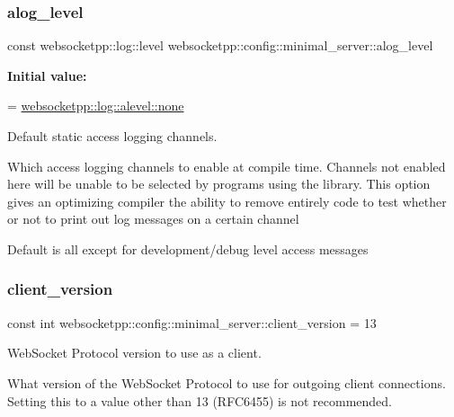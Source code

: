 \subsubsection{\texorpdfstring{alog\+\_\+level}{alog\_level}}
{\footnotesize\ttfamily const websocketpp\+::log\+::level websocketpp\+::config\+::minimal\+\_\+server\+::alog\+\_\+level\hspace{0.3cm}{\ttfamily [static]}}

{\bfseries Initial value\+:}
\begin{DoxyCode}
=
        \mbox{\hyperlink{structwebsocketpp_1_1log_1_1alevel_a4cf0520816094999975fe73081cf30f2}{websocketpp::log::alevel::none}}
\end{DoxyCode}


Default static access logging channels. 

Which access logging channels to enable at compile time. Channels not enabled here will be unable to be selected by programs using the library. This option gives an optimizing compiler the ability to remove entirely code to test whether or not to print out log messages on a certain channel

Default is all except for development/debug level access messages \mbox{\label{structwebsocketpp_1_1config_1_1minimal__server_a186c68735f459a3242d68821c82551bc}} 
\subsubsection{\texorpdfstring{client\+\_\+version}{client\_version}}
{\footnotesize\ttfamily const int websocketpp\+::config\+::minimal\+\_\+server\+::client\+\_\+version = 13\hspace{0.3cm}{\ttfamily [static]}}



Web\+Socket Protocol version to use as a client. 

What version of the Web\+Socket Protocol to use for outgoing client connections. Setting this to a value other than 13 (R\+F\+C6455) is not recommended. \mbox{\label{structwebsocketpp_1_1config_1_1minimal__server_aab09bf45ad78310426a04636ad64c2bd}} 
